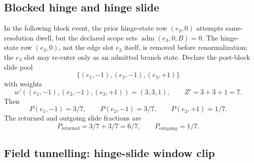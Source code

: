 \subsection{Blocked hinge and hinge slide}\label{manual:dec-ledger:hinge-slide}
In the following block event, the prior hinge-state row \((e_3,0)\) attempts same-resolution dwell, but the declared scope sets \(\operatorname{adm}(e_3,0;B)=0\). The hinge-state row \((e_3,0)\), not the edge slot \(e_3\) itself, is removed before renormalization; the \(e_3\) slot may re-enter only as an admitted branch state. Declare the post-block slide pool
\[
\{(e_1,-1),(e_2,-1),(e_3,+1)\}
\]
with weights
\[
w'((e_1,-1),(e_2,-1),(e_3,+1))=(3,3,1),
\qquad
Z'=3+3+1=7.
\]
Then
\[
P(e_1,-1)=3/7,
\qquad
P(e_2,-1)=3/7,
\qquad
P(e_3,+1)=1/7.
\]
The returned and outgoing slide fractions are
\[
P_{\mathrm{returned}}=3/7+3/7=6/7,
\qquad
P_{\mathrm{outgoing}}=1/7.
\]


\subsection{Field tunnelling: hinge-slide window clip}\label{manual:dec-ledger:field-tunnelling}

